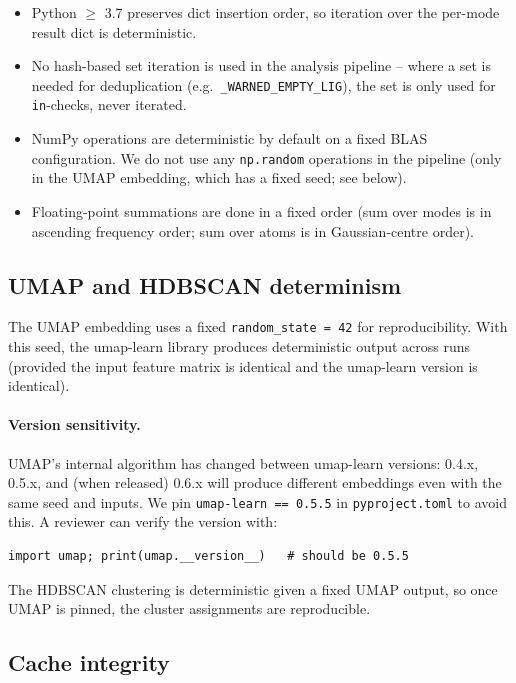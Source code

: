 \documentclass[10pt,a4paper,twoside]{article}
\newcommand{\fn}[1]{\texttt{#1}}
\newcommand{\file}[1]{\texttt{#1}}
\begin{document}
\begin{itemize}
  \item Python $\geq$ 3.7 preserves dict insertion order, so
        iteration over the per-mode result dict is deterministic.
  \item No hash-based set iteration is used in the analysis
        pipeline -- where a set is needed for deduplication
        (e.g.\ \fn{\_WARNED\_EMPTY\_LIG}), the set is only used
        for \fn{in}-checks, never iterated.
  \item NumPy operations are deterministic by default on a fixed
        BLAS configuration. We do not use any \fn{np.random}
        operations in the pipeline (only in the UMAP embedding,
        which has a fixed seed; see below).
  \item Floating-point summations are done in a fixed order (sum
        over modes is in ascending frequency order; sum over
        atoms is in Gaussian-centre order).
\end{itemize}

\subsection{UMAP and HDBSCAN determinism}

The UMAP embedding uses a fixed \texttt{random\_state = 42} for
reproducibility. With this seed, the umap-learn library produces
deterministic output across runs (provided the input feature
matrix is identical and the umap-learn version is identical).

\paragraph{Version sensitivity.}
UMAP's internal algorithm has changed between umap-learn versions:
0.4.x, 0.5.x, and (when released) 0.6.x will produce different
embeddings even with the same seed and inputs. We pin
\texttt{umap-learn == 0.5.5} in \file{pyproject.toml} to avoid
this. A reviewer can verify the version with:

\begin{lstlisting}[style=pycode]
import umap; print(umap.__version__)   # should be 0.5.5
\end{lstlisting}

The HDBSCAN clustering is deterministic given a fixed UMAP output,
so once UMAP is pinned, the cluster assignments are reproducible.

\subsection{Cache integrity}
\end{document}

